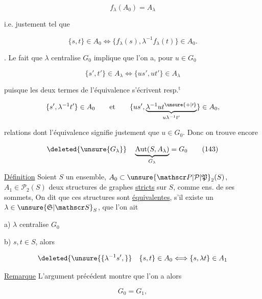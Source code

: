 \[
 f_\lambda(A_0)=A_\lambda
 \tag*{(140)}
\]

i.e. justement tel que

\[
 \{s,t\}\in A_0\Longleftrightarrow\{f_\lambda(s),\lambda^{-1}f_\lambda(t)\}\in A_0.
 \tag*{(141)}
\]


. Le fait que $\lambda$ centralise $G_0$ implique que l'on a, pour $u\in G_0$

\[
 \{s',t'\}\in A_\lambda\Longleftrightarrow\{us',ut'\}\in A_\lambda
 \tag*{(142)}
\]

puisque les deux termes de l'équivalence s'écrivent resp.$^{\mathrm t}$

\[
 \{s',\lambda^{-1}t'\}\in A_0\qquad\text{et}\qquad
 \{us',\underbrace{\lambda^{-1}ut^{\unsure{+|\prime}}}_{u\lambda^{-1}t'}\}\in A_0,
\]

relations dont l'équivalence signifie justement que $u\in G_0$. Donc on trouve encore

\[
 \deleted{\unsure{G_\lambda}}\quad\underbrace{\operatorname{Aut}(S,A_\lambda)}_{G_\lambda}=G_0
 \tag*{(143)}
\]

\uline{Définition} Soient $S$ un ensemble, $A_0\subset\unsure{\mathscr P|\mathcal P|\mathfrak P}_2(S)$, $A_1\in\mathscr P_2(S)$ deux structures de graphes \uline{stricts}  sur $S$,  comme ens. de ses sommets,  On dit que ces structures sont \uline{équivalentes}, s'il existe un $\lambda\in\unsure{\mathfrak S|\mathscr S}_S$,  que  l'on ait

a) $\lambda$ centralise $G_0$

b)   $s,t\in S$, alors

\[
 \deleted{\unsure{\{\lambda^{-1}s',}}\quad
 \{s,t\}\in A_0\Longleftrightarrow\{s,\lambda t\}\in A_1
\]



\uline{Remarque} L'argument précédent montre que l'on a alors

\[
 G_0=G_1,
\]


